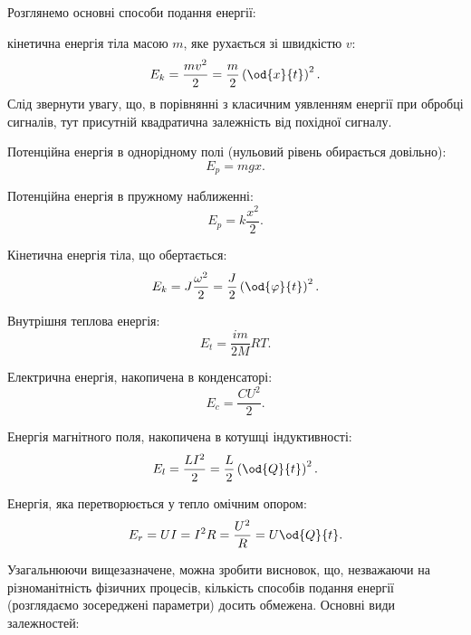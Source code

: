Розглянемо основні способи подання енергії:

кінетична енергія тіла масою $m$, яке рухається зі швидкістю $v$:
%
\begin{equation}
  E_k = \frac{mv^2}{2} = \frac{m}{2} \left( \od{x}{t} \right)^2.
  \label{atu:eq:Ek_v}
\end{equation}
%
Слід звернути увагу, що, в порівнянні з класичним уявленням
енергії при обробці сигналів, тут присутній квадратична
залежність від похідної сигналу.

Потенційна енергія в однорідному полі (нульовий рівень обирається довільно):
%
\begin{equation}
  E_p = m g x .
  \label{atu:eq:Ep_g}
\end{equation}

Потенційна енергія в пружному наближенні:
%
\begin{equation}
  E_p = k \frac{x^2}{2} .
  \label{atu:eq:Ep_spring}
\end{equation}

Кінетична енергія тіла, що обертається:
%
\begin{equation}
  E_k = J \frac{\omega^2}{2} = \frac{J}{2} \left( \od{\varphi}{t} \right)^2 .
  \label{atu:eq:Ek_spin}
\end{equation}

Внутрішня теплова енергія:
%
\begin{equation}
  E_t = \frac{im}{2M} RT.
  \label{atu:eq:Et}
\end{equation}

Електрична енергія, накопичена в конденсаторі:
%
\begin{equation}
  E_c = \frac{C U^2}{2}.
  \label{atu:eq:Ec}
\end{equation}

Енергія магнітного поля, накопичена в котушці індуктивності:
%
\begin{equation}
  E_l = \frac{L I^2}{2} = \frac{L}{2} \left( \od{Q}{t}\right)^2 .
  \label{atu:eq:El}
\end{equation}

Енергія, яка перетворюється у тепло омічним опором:
%
\begin{equation}
  E_r = U I = I^2 R = \frac{U^2}{R} = U \od{Q}{t} .
  \label{atu:eq:Er}
\end{equation}


%


Узагальнюючи вищезазначене, можна зробити висновок, що, незважаючи на
різноманітність фізичних процесів, кількість способів подання енергії
(розглядаємо зосереджені параметри) досить обмежена. Основні види залежностей:

